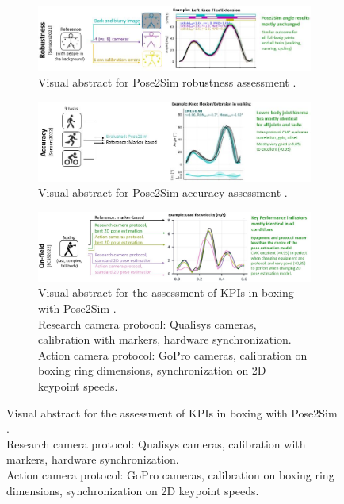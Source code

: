 \begin{figure}[hbtp]
	\centering
	\begin{subfigure}[b]{1\textwidth}
            \centering
            \def\svgwidth{1\columnwidth}
            \fontsize{10pt}{10pt}\selectfont
            \includegraphics[width=\linewidth]{"../Intro/Figures/Fig_VisAbstract2.JPG"}
            \caption{Visual abstract for Pose2Sim robustness assessment \cite{Pagnon2021}.}
            \label{fig_visabstract2_1}
	\end{subfigure}
	\vskip 1cm
      \begin{subfigure}[b]{1\textwidth}
            \centering
            \def\svgwidth{1\columnwidth}
            \fontsize{10pt}{10pt}\selectfont
            \includegraphics[width=\linewidth]{"../Intro/Figures/Fig_VisAbstract3.JPG"}
            \caption{Visual abstract for Pose2Sim accuracy assessment \cite{Pagnon2022a}.}
            \label{fig_visabstract3_1}
	\end{subfigure}
      \vskip 1cm
	\begin{subfigure}[b]{1\textwidth}
            \centering
            \captionsetup{justification=centering}
            \def\svgwidth{1\columnwidth}
            \fontsize{10pt}{10pt}\selectfont
            \includegraphics[width=\linewidth]{"../Intro/Figures/Fig_VisAbstract4.JPG"}
            \caption{Visual abstract for the assessment of KPIs in boxing with Pose2Sim \cite{Pagnon2022c}. \\Research camera protocol: Qualisys cameras, calibration with markers, hardware synchronization. \\Action camera protocol: GoPro cameras, calibration on boxing ring dimensions, synchronization on 2D keypoint speeds.}

\end{subfigure}
\end{figure}
